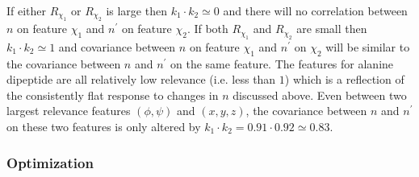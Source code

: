 If either $R_{\chi_1}$ or $R_{\chi_2}$ is large then $k_1 \cdot k_2 \simeq 0$ and there will no correlation between $n$ on feature $\chi_1$ and $n^{\prime}$ on feature $\chi_2$. If both $R_{\chi_1}$ and $R_{\chi_2}$ are small then $k_1 \cdot k_2 \simeq 1$ and covariance between $n$ on feature $\chi_1$ and $n^{\prime}$ on $\chi_2$ will be similar to the covariance between $n$ and $n^{\prime}$ on the same feature.  The features for alanine dipeptide are all relatively low relevance (i.e. less than $1$) which is a reflection of the  consistently flat response to changes in $n$ discussed above. Even between  two largest relevance features $(\phi, \psi)$ and $(x,y,z)$, the covariance between $n$ and $n^{\prime}$ on these two features is only altered by  $k_{1}\cdot k_{2} = 0.91\cdot0.92 \simeq 0.83$. 


\subsubsection{Optimization}\label{subsubsec:ala_opt}

